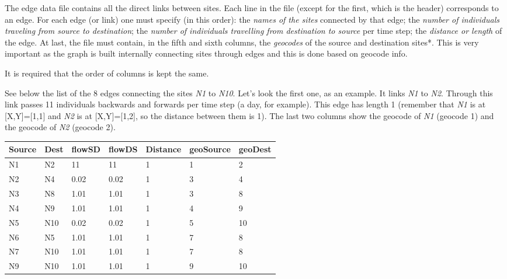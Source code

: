 \documentclass[a4paper,10pt]{manual}
\begin{document}
The edge data file contains all the direct links between sites. Each line in the file (except for the first, which is the header) corresponds to an edge. For each edge (or link) one must specify (in this order): the \emph{names of the sites} connected by that edge; the \emph{number of individuals traveling from source to destination}; the \emph{number of individuals travelling from destination to source} per time step; the \emph{distance or length} of the edge. At last, the file must contain, in the fifth and sixth columns, the \emph{geocodes} of the source and destination sites*. This is very important as the graph is built internally connecting sites through edges and this is done based on geocode info.

\begin{notice}[warning]
It is required that the order of columns is kept the same.
\end{notice}

See below the list of the 8 edges connecting the sites \emph{N1} to \emph{N10}. Let's look the first one, as an example. It links \emph{N1} to \emph{N2}. Through this link passes 11 individuals backwards and forwards per time step (a day, for example). This edge has length 1 (remember that \emph{N1} is at {[}X,Y{]}={[}1,1{]} and \emph{N2} is at {[}X,Y{]}={[}1,2{]}, so the distance between them is 1). The last two columns show the geocode of \emph{N1} (geocode 1) and the geocode of \emph{N2} (geocode 2).

\begin{tabulary}{\textwidth}{|L|L|L|L|L|L|L|}
\hline
\textbf{
Source
} & \textbf{
Dest
} & \textbf{
flowSD
} & \textbf{
flowDS
} & \textbf{
Distance
} & \textbf{
geoSource
} & \textbf{
geoDest
}\\
\hline

N1
 & 
N2
 & 
11
 & 
11
 & 
1
 & 
1
 & 
2
\\

N2
 & 
N4
 & 
0.02
 & 
0.02
 & 
1
 & 
3
 & 
4
\\

N3
 & 
N8
 & 
1.01
 & 
1.01
 & 
1
 & 
3
 & 
8
\\

N4
 & 
N9
 & 
1.01
 & 
1.01
 & 
1
 & 
4
 & 
9
\\

N5
 & 
N10
 & 
0.02
 & 
0.02
 & 
1
 & 
5
 & 
10
\\

N6
 & 
N5
 & 
1.01
 & 
1.01
 & 
1
 & 
7
 & 
8
\\

N7
 & 
N10
 & 
1.01
 & 
1.01
 & 
1
 & 
7
 & 
8
\\

N9
 & 
N10
 & 
1.01
 & 
1.01
 & 
1
 & 
9
 & 
10
\\
\hline
\end{tabulary}
\end{document}
